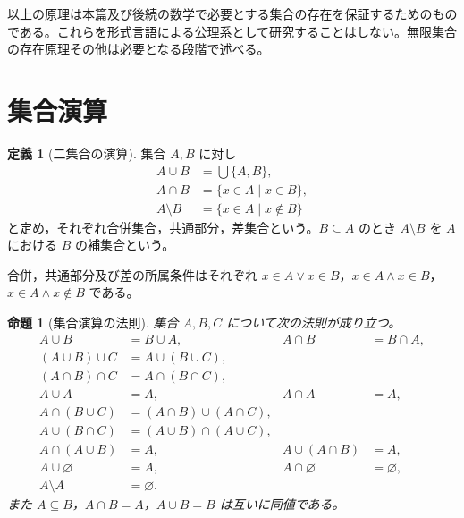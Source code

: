 \documentclass[a5paper,10pt,dvipdfmx]{jsarticle}
\theoremstyle{definition}
\newtheorem{defn}[ruledef]{定義}
\theoremstyle{plain}
\newtheorem{prop}[ruledef]{命題}
\begin{document}
以上の原理は本篇及び後続の数学で必要とする集合の存在を保証するためのものである。これらを形式言語による公理系として研究することはしない。無限集合の存在原理その他は必要となる段階で述べる。
\section{集合演算}
\begin{defn}[二集合の演算]\label{k29}
集合 $A,B$ に対し
\begin{align*}
 A\cup B&=\bigcup\{A,B\},\\
 A\cap B&=\{x\in A\mid x\in B\},\\
 A\setminus B&=\{x\in A\mid x\notin B\}
\end{align*}
と定め，それぞれ合併集合，共通部分，差集合という。$B\subseteq A$ のとき $A\setminus B$ を $A$ における $B$ の補集合という。
\end{defn}
合併，共通部分及び差の所属条件はそれぞれ $x\in A\lor x\in B$，$x\in A\land x\in B$，$x\in A\land x\notin B$ である。
\begin{prop}[集合演算の法則]\label{k30}
集合 $A,B,C$ について次の法則が成り立つ。
\begin{align*}
 A\cup B&=B\cup A,& A\cap B&=B\cap A,\\
 (A\cup B)\cup C&=A\cup(B\cup C),\\
 (A\cap B)\cap C&=A\cap(B\cap C),\\
 A\cup A&=A,& A\cap A&=A,\\
 A\cap(B\cup C)&=(A\cap B)\cup(A\cap C),\\
 A\cup(B\cap C)&=(A\cup B)\cap(A\cup C),\\
 A\cap(A\cup B)&=A,& A\cup(A\cap B)&=A,\\
 A\cup\varnothing&=A,& A\cap\varnothing&=\varnothing,\\
 A\setminus A&=\varnothing.
\end{align*}
また $A\subseteq B$，$A\cap B=A$，$A\cup B=B$ は互いに同値である。
\end{prop}
\end{document}
